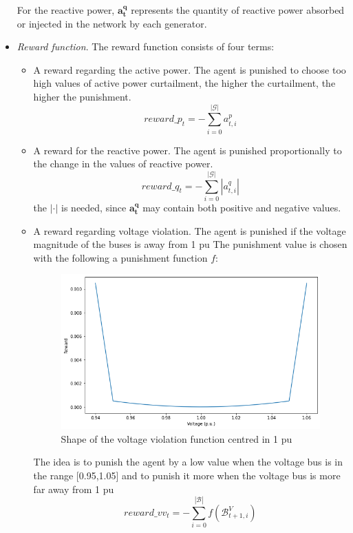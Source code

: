\begin{itemize}
    For the reactive power, $\mathbf{a^q_t}$ represents the quantity of reactive power absorbed or injected in the network by each generator. 
    
    
    \item \label{4:rewfunc} \emph{Reward function}. The reward function consists of four terms:
    \begin{itemize}
        \item A reward regarding the active power. The agent is punished to choose too high values of active power curtailment, the higher the curtailment, the higher the punishment.
        \[
            reward\_p_t = -\sum_{i=0}^{|\mathcal{G}|}a^p_{t,i}
        \]
        
        \item A reward for the reactive power. The agent is punished proportionally to the change in the values of reactive power. 
        \[
            reward\_q_t = -\sum_{i=0}^{|\mathcal{G}|} |a^q_{t,i}|
        \]
        \noindent the $|\cdot|$ is needed, since $\mathbf{a^q_t}$ may contain both positive and negative values.
        
        \item A reward regarding voltage violation. The agent is punished if the voltage magnitude of the buses is away from 1 \gls{pu} The punishment value is chosen with the following a punishment function $f$:
        \begin{figure}[H]
        \centering
            \includegraphics[width=.4\linewidth]{images/MVOberr/RL/volatge_violation_function.png}
            \caption[Voltage violation function]{Shape of the voltage violation function centred in 1 \gls{pu}}
        \end{figure}
        \noindent The idea is to punish the agent by a low value when the voltage bus is in the range [0.95,1.05] and to punish it more when the voltage bus is more far away from 1 \gls{pu}
        \[
            reward\_vv_t = -\sum_{i=0}^{|\mathcal{B}|} f(\mathcal{B}^{V}_{t+1,i})
        \]
        

\end{itemize}
\end{itemize}
